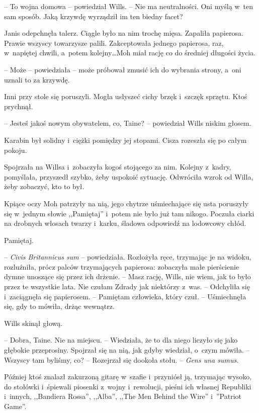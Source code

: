 \documentclass[oneside,polish,11pt,sfheadings]{mwbk}
\begin{document}
-- To wojna domowa -- powiedział Wills. -- Nie ma neutralności. Oni myślą w~ten sam sposób. Jaką krzywdę wyrządził im ten biedny facet?

Janis odepchnęła talerz. Ciągle było na nim trochę mięsa. Zapaliła
papierosa. Prawie wszyscy towarzysze palili. Zakceptowała jednego
papierosa, raz, w~napiętej chwili, a~potem kolejny\ldots Moh miał rację co
do średniej długości życia.

-- Może -- powiedziała -- może próbował zmusić ich do wybrania strony, a~oni uznali to za krzywdę.

Inni przy stole się poruszyli. Mogła usłyszeć cichy brzęk i~szczęk
sprzętu. Ktoś prychnął.

-- Jesteś jakoś nowym obywatelem, co, Taine? -- powiedział Wills niskim
głosem.

Karabin był solidny i~ciężki pomiędzy jej stopami. Cisza rozeszła się po
całym pokoju.

Spojrzała na Willsa i~zobaczyła kogoś stojącego za nim. Kolejny z~kadry,
pomyślała, przyszedł szybko, żeby uspokoić sytuację. Odwróciła wzrok od
Willa, żeby zobaczyć, kto to był.

Kpiące oczy Moh patrzyły na nią, jego chytrze uśmiechające się usta
poruszyły się w~jednym słowie ,,Pamiętaj'' i~potem nie było już tam
nikogo. Poczuła ciarki na drobnych włosach twarzy i~karku, śladowa
odpowiedź na lodowcowy chłód.

Pamiętaj.

-- \emph{Civis Britannicus sum} -- powiedziała. Rozłożyła ręce, trzymając
je na widoku, rozluźniła, prócz palców trzymających papierosa: zobaczyła
małe pierścienie dymne unoszące się przez ich drżenie. -- Masz rację,
Wills, nie wiem, jak to było przez te wszystkie lata. Nie czułam Zdrady
jak niektórzy z~was. -- Odchyliła się i~zaciągnęła się papierosem. -- Pamiętam człowieka, który czuł. -- Uśmiechnęła się, gdy to mówiła, drżąc
wewnątrz.

Wills skinął głową. 

-- Dobra, Taine. Nie na miejscu. -- Wiedziała, że to
dla niego liczyło się jako głębokie przeprosiny. Spojrzał się na nią,
jak gdyby wiedział, o~czym mówiła. -- Wszyscy tam byliśmy, co? -- Rozejrzał się dookoła stołu. -- \emph{Gens una sumus.}

Później ktoś znalazł zakurzoną gitarę w~szafie i~przyniósł ją, trzymając
wysoko, do stołówki i~śpiewali piosenki z~wojny i~rewolucji, pieśni ich
własnej Republiki i~innych, ,,Bandiera Rossa'', ,,Alba'', ,,The Men Behind
the Wire'' i~''Patriot Game''.
\end{document}

